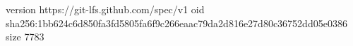 version https://git-lfs.github.com/spec/v1
oid sha256:1bb624c6d850fa3fd5805fa6f9c266eaac79da2d816e27d80c36752dd05e0386
size 7783
